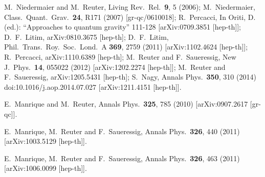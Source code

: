 \documentclass[twocolumn,prd,superscriptaddress,preprintnumbers,amsmath,amssymb,nofootinbib]{revtex4}
\begin{document}
\begin{thebibliography}{99}
  M.~Niedermaier and M.~Reuter,
  Living Rev.\ Rel.\  {\bf 9}, 5 (2006);
  M.~Niedermaier,
  Class.\ Quant.\ Grav.\  {\bf 24}, R171 (2007)
  [gr-qc/0610018];
  R.~Percacci,
  In Oriti, D. (ed.): ``Approaches to quantum gravity'' 111-128
  [arXiv:0709.3851 [hep-th]];
  D.~F.~Litim,
  arXiv:0810.3675 [hep-th];
  D.~F.~Litim,
  Phil.\ Trans.\ Roy.\ Soc.\ Lond.\ A {\bf 369}, 2759 (2011)
  [arXiv:1102.4624 [hep-th]];
  R.~Percacci,
  arXiv:1110.6389 [hep-th];
  M.~Reuter and F.~Saueressig,
  New J.\ Phys.\  {\bf 14}, 055022 (2012)
  [arXiv:1202.2274 [hep-th]];
  M.~Reuter and F.~Saueressig,
  arXiv:1205.5431 [hep-th];
%
  S.~Nagy,
 Annals Phys.\  {\bf 350}, 310 (2014)
  doi:10.1016/j.aop.2014.07.027
  [arXiv:1211.4151 [hep-th]].

  
  E.~Manrique and M.~Reuter,
  Annals Phys.\  {\bf 325}, 785 (2010)
  [arXiv:0907.2617 [gr-qc]].

  E.~Manrique, M.~Reuter and F.~Saueressig,
  Annals Phys.\  {\bf 326}, 440 (2011)
  [arXiv:1003.5129 [hep-th]].

  E.~Manrique, M.~Reuter and F.~Saueressig,
  Annals Phys.\  {\bf 326}, 463 (2011)
  [arXiv:1006.0099 [hep-th]].


\end{thebibliography}
\end{document}
